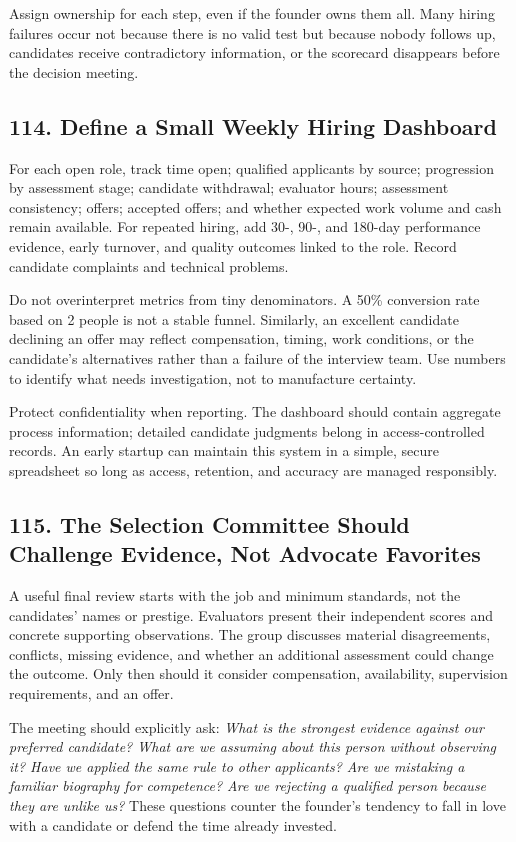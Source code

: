 Assign ownership for each step, even if the founder owns them all. Many hiring failures occur not because there is no valid test but because nobody follows up, candidates receive contradictory information, or the scorecard disappears before the decision meeting.

\subsection*{114. Define a Small Weekly Hiring Dashboard}

For each open role, track time open; qualified applicants by source; progression by assessment stage; candidate withdrawal; evaluator hours; assessment consistency; offers; accepted offers; and whether expected work volume and cash remain available. For repeated hiring, add 30-, 90-, and 180-day performance evidence, early turnover, and quality outcomes linked to the role. Record candidate complaints and technical problems.

Do not overinterpret metrics from tiny denominators. A 50\% conversion rate based on 2 people is not a stable funnel. Similarly, an excellent candidate declining an offer may reflect compensation, timing, work conditions, or the candidate's alternatives rather than a failure of the interview team. Use numbers to identify what needs investigation, not to manufacture certainty.

Protect confidentiality when reporting. The dashboard should contain aggregate process information; detailed candidate judgments belong in access-controlled records. An early startup can maintain this system in a simple, secure spreadsheet so long as access, retention, and accuracy are managed responsibly.

\subsection*{115. The Selection Committee Should Challenge Evidence, Not Advocate Favorites}

A useful final review starts with the job and minimum standards, not the candidates' names or prestige. Evaluators present their independent scores and concrete supporting observations. The group discusses material disagreements, conflicts, missing evidence, and whether an additional assessment could change the outcome. Only then should it consider compensation, availability, supervision requirements, and an offer.

The meeting should explicitly ask: \textit{What is the strongest evidence against our preferred candidate? What are we assuming about this person without observing it? Have we applied the same rule to other applicants? Are we mistaking a familiar biography for competence? Are we rejecting a qualified person because they are unlike us?} These questions counter the founder's tendency to fall in love with a candidate or defend the time already invested.


